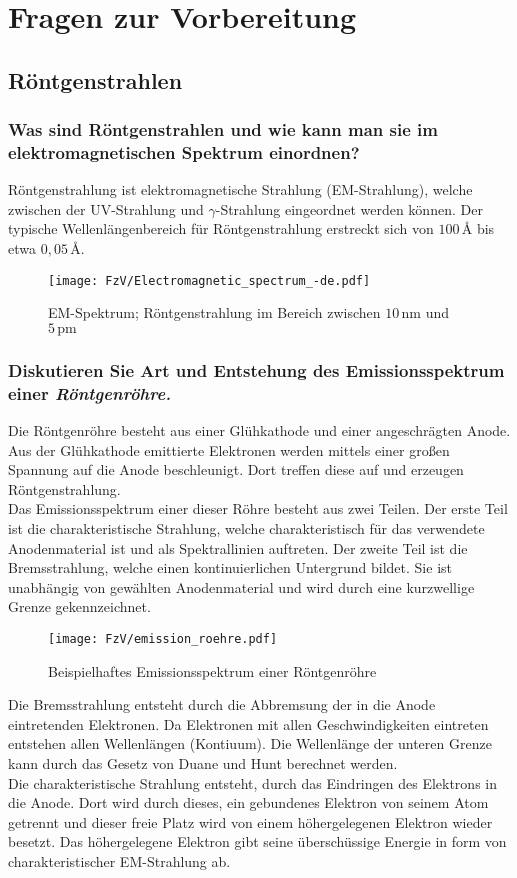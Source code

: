 
\chapter{Fragen zur Vorbereitung}
\label{chap:fvz}

\section{Röntgenstrahlen}
\subsection*{Was sind Röntgenstrahlen und wie kann man sie im elektromagnetischen Spektrum einordnen?}
Röntgenstrahlung ist elektromagnetische Strahlung (EM-Strahlung), welche zwischen der UV-Strahlung und $\gamma$-Strahlung eingeordnet werden können.
Der typische Wellenlängenbereich für Röntgenstrahlung erstreckt sich von $100\,\text{\AA}$ bis etwa $0,05\,\text{\AA}$.
\begin{figure}[htb]
    \centering\texttt{[image: FzV/Electromagnetic\_spectrum\_-de.pdf]}
    \caption{EM-Spektrum; Röntgenstrahlung im Bereich zwischen $10\,\text{nm}$ und $5\,\text{pm}$ \cite{emspektrum}}
\end{figure}
\subsection*{Diskutieren Sie Art und Entstehung des Emissionsspektrum einer \textit{Röntgenröhre.}}
Die Röntgenröhre besteht aus einer Glühkathode und einer angeschrägten Anode.
Aus der Glühkathode emittierte Elektronen werden mittels einer großen Spannung auf die Anode beschleunigt.
Dort treffen diese auf und erzeugen Röntgenstrahlung.\\
Das Emissionsspektrum einer dieser Röhre besteht aus zwei Teilen.
Der erste Teil ist die charakteristische Strahlung, welche charakteristisch für das verwendete Anodenmaterial ist und als Spektrallinien auftreten.
Der zweite Teil ist die Bremsstrahlung, welche einen kontinuierlichen Untergrund bildet.
Sie ist unabhängig von gewählten Anodenmaterial und wird durch eine kurzwellige Grenze gekennzeichnet.\newpage
\begin{figure}[htb]
    \centering\texttt{[image: FzV/emission\_roehre.pdf]}
    \caption{Beispielhaftes Emissionsspektrum einer Röntgenröhre \cite{emissionsspektrum}}   
\end{figure}
Die Bremsstrahlung entsteht durch die Abbremsung der in die Anode eintretenden Elektronen.
Da Elektronen mit allen Geschwindigkeiten eintreten entstehen allen Wellenlängen (Kontiuum).
Die Wellenlänge der unteren Grenze kann durch das Gesetz von Duane und Hunt berechnet werden.\\
Die charakteristische Strahlung entsteht, durch das Eindringen des Elektrons in die Anode.
Dort wird durch dieses, ein gebundenes Elektron von seinem Atom getrennt und dieser freie Platz wird von einem höhergelegenen Elektron wieder besetzt.
Das höhergelegene Elektron gibt seine überschüssige Energie in form von charakteristischer EM-Strahlung ab. \cite{EKS}
